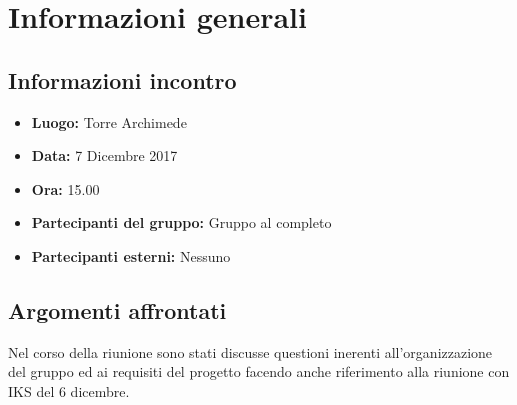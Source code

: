 \documentclass[a4paper, oneside, openany]{article}
\begin{document}
	\section{Informazioni generali}
		\subsection{Informazioni incontro}
			\begin{itemize}
				\item { \textbf{Luogo:} Torre Archimede  }
				\item { \textbf{Data:} 7 Dicembre 2017 }
				\item { \textbf{Ora:} 15.00 }
				\item { \textbf{Partecipanti del gruppo:} Gruppo al completo }
				\item { \textbf{Partecipanti esterni:} Nessuno }
			\end{itemize}
		
	
	\subsection{Argomenti affrontati}
    Nel corso della riunione sono stati discusse questioni inerenti all'organizzazione del gruppo ed ai requisiti del progetto facendo anche riferimento alla riunione con IKS del 6 dicembre.
    
\end{document}
